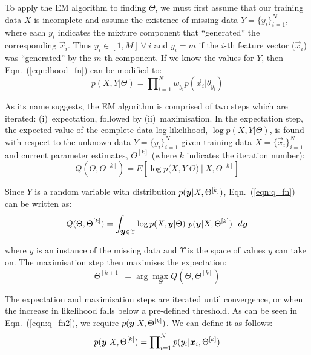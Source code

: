 To apply the EM algorithm to finding $\Theta$, we must first assume that our training data $X$ is incomplete
and assume the existence of missing data $Y = \{y_i\}_{i=1}^{N}$,
where each $y_i$ indicates the mixture component that ``generated'' the corresponding $\Vec{x}_i$.
Thus $y_i \in [1,M] ~ \forall ~ i$ and $y_i = m$ if the $i$-th feature vector ($\Vec{x}_i$) was ``generated'' by the $m$-th component.
If we know the values for $Y$, then Eqn.~(\ref{eqn:lhood_fn}) can be modified to:
%
\begin{equation}
	p(X,Y | \Theta) = \prod\nolimits_{i=1}^{N} w_{y_i} p(\Vec{x}_i| \theta_{y_i})
	\label{eqn:lhood_fn_modified}
\end{equation}

\noindent
As its name suggests, the EM algorithm is comprised of two steps which are iterated: (i)~expectation, followed by (ii)~maximisation.
In the expectation step, the expected value of the complete data log-likelihood, $\log p(X,Y | \Theta)$,
is found with respect to the unknown data $Y = \{y_i\}_{i=1}^{N}$ given training data $X=\{\Vec{x}_i\}_{i=1}^{N}$ and current parameter estimates,
$\Theta^{[k]}$ (where $k$ indicates the iteration number):
%
\begin{equation}
	Q(\Theta, \Theta^{[k]}) = E \left[ \log p(X,Y | \Theta) ~|~ X,\Theta^{[k]} \right]
	\label{eqn:q_fn}
\end{equation}

\noindent
Since $Y$ is a random variable with distribution $p(\mbox{\boldmath $y$}|X,\Theta^{[k]})$, Eqn.~(\ref{eqn:q_fn}) can be written as:
%
\begin{equation}
	Q(\Theta, \Theta^{[k]}) = \int_{\mbox{\boldmath $y$} \in \Upsilon}
								\log p(X,\mbox{\boldmath $y$} | \Theta) ~ p(\mbox{\boldmath $y$}|X,\Theta^{[k]}) ~~ d \mbox{\boldmath $y$}
	\label{eqn:q_fn2}
\end{equation}

\noindent
where \mbox{\boldmath $y$} is an instance of the missing data and $\Upsilon$ is the space of values \mbox{\boldmath $y$} can take on.
The maximisation step then maximises the expectation:
%
\begin{equation}
	\Theta^{[k+1]} = \arg \max_{\Theta} Q(\Theta, \Theta^{[k]})
	\label{eqn:maximize}
\end{equation}

\noindent
The expectation and maximisation steps are iterated until convergence,
or when the increase in likelihood falls below a pre-defined threshold.
As can be seen in Eqn.~(\ref{eqn:q_fn2}), we require $p(\mbox{\boldmath $y$}|X,\Theta^{[k]})$.
We can define it as follows:
%
\begin{equation}
	p(\mbox{\boldmath $y$}|X,\Theta^{[k]}) = \prod\nolimits_{i=1}^{N} p(y_i | \Vec{x}_i, \Theta^{[k]})
\end{equation}

